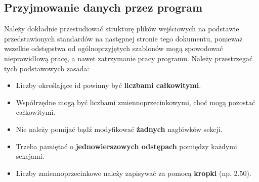 \documentclass{article}
\newcommand\tab[1][1cm]{\hspace*{#1}}
\begin{document}
\subsection{Przyjmowanie danych przez program}
\tab Należy dokładnie przestudiować strukturę plików wejściowych na podstawie przedstawionych standardów na następnej stronie tego dokumentu, ponieważ wszelkie odstępstwa od ogólnoprzyjętych szablonów mogą spowodować nieprawidłową pracę, a nawet zatrzymanie pracy programu. Należy przestrzegać tych podstawowych zasada:
\begin{itemize}
    \item Liczby określające id powinny być \textbf{liczbami całkowitymi}.
    \item Współrzędne mogą być liczbami zmiennoprzecinkowymi, choć mogą pozostać całkowitymi.
    \item Nie należy pomijać bądź modyfikować \textbf{żadnych} nagłówków sekcji.
    \item Trzeba pamiętać o \textbf{jednowierszowych odstępach} pomiędzy każdymi sekcjami.
    \item Liczby zmiennoprzecinkowe należy zapisywać za pomocą \textbf{kropki} (np. 2.50).
\end{itemize}
\newpage
\end{document}
